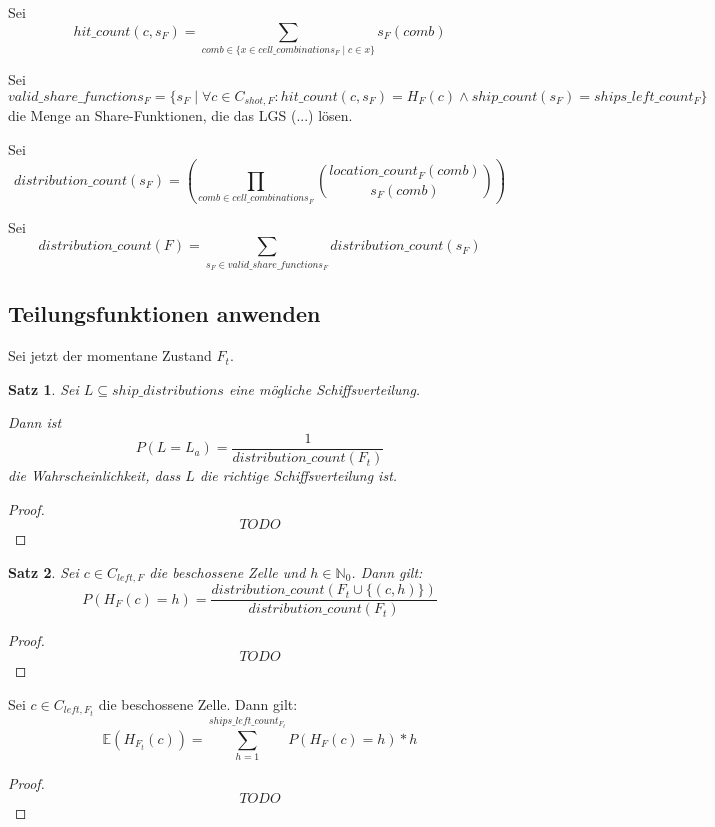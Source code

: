 \documentclass[a4paper,12pt]{llncs}
\newcommand{\N}{{\mathbb{N}}}
\numberwithin{equation}{section}
\newtheorem{satz}{Satz}
\begin{document}
\begin{definition}
Sei
\[
hit\_count(c, s_F)=\sum_{comb \in \{x \in cell\_combinations_F \mid c \in x\}}{s_F(comb)}
\]
\end{definition}

\begin{definition}
Sei
\[
valid\_share\_functions_F=\{s_F \mid \forall{c \in C_{shot,F}}\colon hit\_count(c, s_F)=H_F(c) \wedge ship\_count(s_F) =ships\_left\_count_F\}
\]
die Menge an Share-Funktionen, die das LGS (...) lösen.
\end{definition}

\begin{definition}
Sei
\[
distribution\_count(s_F)=
\left( \prod_{comb \in cell\_combinations_F}{{location\_count_F(comb)\choose s_F(comb)}} \right)
\]
\end{definition}

\begin{definition}
Sei
\[
distribution\_count(F)=\sum_{s_F \in valid\_share\_functions_F}{distribution\_count(s_F)}
\]
\end{definition}

\subsection{Teilungsfunktionen anwenden}

Sei jetzt der momentane Zustand $F_t$.

\begin{satz}
Sei $L \subseteq ship\_distributions$ eine mögliche Schiffsverteilung.

Dann ist
\[
P(L = L_a)=\frac{1}{distribution\_count(F_t)}
\]
die Wahrscheinlichkeit, dass $L$ die richtige Schiffsverteilung ist.
\end{satz}

\begin{proof}
\[
TODO
\]
\end{proof}

\begin{satz}
Sei $c \in C_{left,F}$ die beschossene Zelle und $h \in \N_0$.
Dann gilt:
\[
P(H_F(c)=h)=\frac{distribution\_count(F_t \cup \{(c, h)\})}{distribution\_count(F_t)}
\]
\end{satz}

\begin{proof}
\[
TODO
\]
\end{proof}

\begin{theorem}
Sei $c \in C_{left,{F_t}}$ die beschossene Zelle.
Dann gilt:
\[
\mathds{E}(H_{F_t}(c))=\sum_{h=1}^{ships\_left\_count_{F_t}} P(H_F(c)=h) * h
\]
\end{theorem}

\begin{proof}
\[
TODO
\]
\end{proof}

\newpage

 

\end{document}
